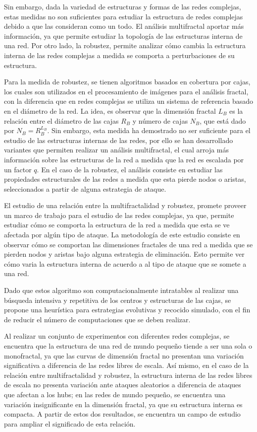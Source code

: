 Sin embargo, dada la variedad de estructuras y formas de las redes complejas, estas medidas no son suficientes para estudiar la estructura de redes complejas debido a que las consideran como un todo\cite{Song2005}. El análisis multifractal aportar más información\cite{Li2014}, ya que permite estudiar la topología de las estructuras interna de una red. Por otro lado, la robustez\cite{Schneider2011}, permite analizar cómo cambia la estructura interna de las redes complejas a medida se comporta a perturbaciones de su estructura.

Para la medida de robustez, se tienen algoritmos basados en cobertura por cajas\cite{Song2007}, los cuales son utilizados en el procesamiento de imágenes para el análisis fractal, con la diferencia que en redes complejas se utiliza un sistema de referencia basado en el diámetro de la red. La idea, es observar que la dimensión fractal $L_B$ es la relación entre el diámetro de las cajas $R_B$ y número de cajas $N_B$, que está dado por $N_B=R_{B}^{L_B}$. Sin embargo, esta medida ha demostrado no ser suficiente para el estudio de las estructuras internas de las redes\cite{Wang2012}, por ello se han desarrollado variantes que permiten realizar un análisis multifractal, el cual arroja más información sobre las estructuras de la red a medida que la red es escalada por un factor $q$. En el caso de la robustez, el análisis consiste en estudiar las propiedades estructurales de las redes a medida que esta pierde nodos o aristas, seleccionados a partir de alguna estrategia de ataque.

El estudio de una relación entre la multifractalidad y robustez, promete proveer un marco de trabajo para el estudio de las redes complejas, ya que, permite estudiar cómo se comporta la estructura de la red a medida que esta se ve afectada por algún tipo de ataque. La metodología de este estudio consiste en observar cómo se comportan las dimensiones fractales de una red a medida que se pierden nodos y aristas bajo alguna estrategia de eliminación. Esto permite ver cómo varia la estructura interna de acuerdo a al tipo de ataque que se somete a una red.

Dado que estos algoritmo son computacionalmente intratables al realizar una búsqueda intensiva y repetitiva de los centros y estructuras de las cajas, se propone una heurística para estrategias evolutivas y recocido simulado, con el fin de reducir el número de computaciones que se deben realizar.

Al realizar un conjunto de experimentos con diferentes redes complejas, se encuentra que la estructura de una red de mundo pequeño tiende a ser una sola o monofractal, ya que las curvas de dimensión fractal no presentan una variación significativa a diferencia de las redes libres de escala. Así mismo, en el caso de la relación entre multifractalidad y robustez, la estructura interna de las redes libres de escala no presenta variación ante ataques aleatorios a diferencia de ataques que afectan a los hubs; en las redes de mundo pequeño, se encuentra una variación insignificante en la dimensión fractal, ya que su estructura interna es compacta. A partir de estos dos resultados, se encuentra un campo de estudio para ampliar el significado de esta relación.


